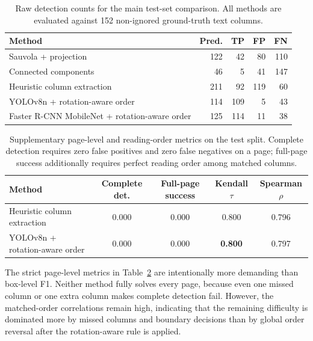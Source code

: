 \documentclass[pdflatex,sn-mathphys-num]{sn-jnl}
\begin{document}
\begin{table}[t]
\centering
\scriptsize\setlength{\tabcolsep}{3pt}
\caption{Raw detection counts for the main test-set comparison. All methods are evaluated against 152 non-ignored ground-truth text columns.}
\label{tab:main_counts}
\begin{tabular}{lrrrr}
\toprule
Method & Pred. & TP & FP & FN \\
\midrule
Sauvola + projection & 122 & 42 & 80 & 110 \\
Connected components & 46 & 5 & 41 & 147 \\
Heuristic column extraction & 211 & 92 & 119 & 60 \\
YOLOv8n + rotation-aware order & 114 & 109 & 5 & 43 \\
Faster R-CNN MobileNet + rotation-aware order & 125 & 114 & 11 & 38 \\
\bottomrule
\end{tabular}
\end{table}

\begin{table}
\centering
\scriptsize\setlength{\tabcolsep}{3pt}
\caption{Supplementary page-level and reading-order metrics on the test split. Complete detection requires zero false positives and zero false negatives on a page; full-page success additionally requires perfect reading order among matched columns.}
\label{tab:enhanced_order}
\begin{tabular}{lcccc}
\toprule
Method & Complete det. & Full-page success & Kendall $\tau$ & Spearman $\rho$ \\
\midrule
Heuristic column extraction & 0.000 & 0.000 & 0.800 & 0.796 \\
YOLOv8n + rotation-aware order & 0.000 & 0.000 & \textbf{0.800} & 0.797 \\
\bottomrule
\end{tabular}
\end{table}

The strict page-level metrics in Table~\ref{tab:enhanced_order} are intentionally more demanding than box-level F1. Neither method fully solves every page, because even one missed column or one extra column makes complete detection fail. However, the matched-order correlations remain high, indicating that the remaining difficulty is dominated more by missed columns and boundary decisions than by global order reversal after the rotation-aware rule is applied.
\end{document}
